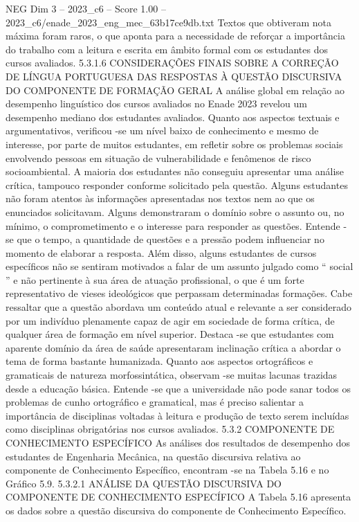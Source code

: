 \begin{textsample}{NEG Dim 3 – 2023\_c6 – Score 1.00 – 2023\_c6/enade\_2023\_eng\_mec\_63b17ce9db.txt}
Textos que obtiveram nota máxima foram raros, o que aponta para a necessidade de reforçar a importância do trabalho com a leitura e escrita em âmbito formal com os estudantes dos cursos avaliados. 5.3.1.6 CONSIDERAÇÕES FINAIS SOBRE A CORREÇÃO DE LÍNGUA PORTUGUESA DAS RESPOSTAS À QUESTÃO DISCURSIVA DO COMPONENTE DE FORMAÇÃO GERAL A análise global em relação ao desempenho linguístico dos cursos avaliados no Enade 2023 revelou um desempenho mediano dos estudantes avaliados.
Quanto aos aspectos textuais e argumentativos, verificou -se um nível baixo de conhecimento e mesmo de interesse, por parte de muitos estudantes, em refletir sobre os problemas sociais envolvendo pessoas em situação de vulnerabilidade e fenômenos de risco socioambiental.
A maioria dos estudantes não conseguiu apresentar uma análise crítica, tampouco responder conforme solicitado pela questão.
Alguns estudantes não foram atentos às informações apresentadas nos textos nem ao que os enunciados solicitavam.
Alguns demonstraram o domínio sobre o assunto ou, no mínimo, o comprometimento e o interesse para responder as questões.
Entende -se que o tempo, a quantidade de questões e a pressão podem influenciar no momento de elaborar a resposta.
Além disso, alguns estudantes de cursos específicos não se sentiram motivados a falar de um assunto julgado como “ social ” e não pertinente à sua área de atuação profissional, o que é um forte representativo de vieses ideológicos que perpassam determinadas formações.
Cabe ressaltar que a questão abordava um conteúdo atual e relevante a ser considerado por um indivíduo plenamente capaz de agir em sociedade de forma crítica, de qualquer área de formação em nível superior.
Destaca -se que estudantes com aparente domínio da área de saúde apresentaram inclinação crítica a abordar o tema de forma bastante humanizada.
Quanto aos aspectos ortográficos e gramaticais de natureza morfossintática, observam -se muitas lacunas trazidas desde a educação básica.
Entende -se que a universidade não pode sanar todos os problemas de cunho ortográfico e gramatical, mas é preciso salientar a importância de disciplinas voltadas à leitura e produção de texto serem incluídas como disciplinas obrigatórias nos cursos avaliados. 5.3.2 COMPONENTE DE CONHECIMENTO ESPECÍFICO As análises dos resultados de desempenho dos estudantes de Engenharia Mecânica, na questão discursiva relativa ao componente de Conhecimento Específico, encontram -se na Tabela 5.16 e no Gráfico 5.9. 5.3.2.1 ANÁLISE DA QUESTÃO DISCURSIVA DO COMPONENTE DE CONHECIMENTO ESPECÍFICO A Tabela 5.16 apresenta os dados sobre a questão discursiva do componente de Conhecimento Específico.

\end{textsample}

